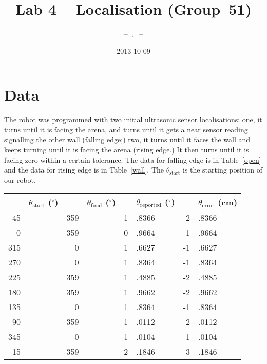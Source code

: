 \documentclass[twocolumn]{article}
\author{\bname~--~\bid, \name~--~\id}
\title{Lab 4 -- Localisation (Group~51)}
\date{2013-10-09}
\def\degree{\ensuremath{^\circ}}
\begin{document}
\maketitle



\section{Data}

The robot was programmed with two initial ultrasonic sensor localisations: one, it turns until it is facing the arena, and turns until it gets a near sensor reading signalling the other wall (falling edge;) two, it turns until it faces the wall and keeps turning until it is facing the arena (rising edge.) It then turns until it is facing zero within a certain tolerance. The data for falling edge is in Table~\ref{open} and the data for rising edge is in Table~\ref{wall}. The $\theta_{\text{start}}$ is the starting position of our robot.

\begin{table*}[htb]
\begin{center}\begin{tabular}{r@{}l r@{}l r@{}l r@{}l}
&$\theta_{\text{start}}$ (\degree)& &$\theta_{\text{final}}$ (\degree)& &$\theta_{\text{reported}}$ (\degree)& &$\theta_{\text{error}}$ (cm) \\
\hline
45&& 359&& 1&.8366& -2&.8366 \\
0&& 359&& 0&.9664& -1&.9664 \\
315&& 0&& 1&.6627& -1&.6627 \\
270&& 0&& 1&.8364& -1&.8364 \\
225&& 359&& 1&.4885& -2&.4885 \\
180&& 359&& 1&.9662& -2&.9662 \\
135&& 0&& 1&.8364& -1&.8364 \\
90&& 359&& 1&.0112& -2&.0112 \\
345&& 0&& 1&.0104& -1&.0104 \\
15&& 359&& 2&.1846& -3&.1846 \\
\end{tabular}\end{center}
\caption{Facing out using {\tt LocalizationType.FALLING\_EDGE}.
$\theta_{\text{start}}$ is the starting orientation of the robot.
The error mean is $-2.1799$, variance is $0.4555$, and the corrected sample standard deviation is $0.6749$.}
\label{open}
\end{table*}
\end{document}
